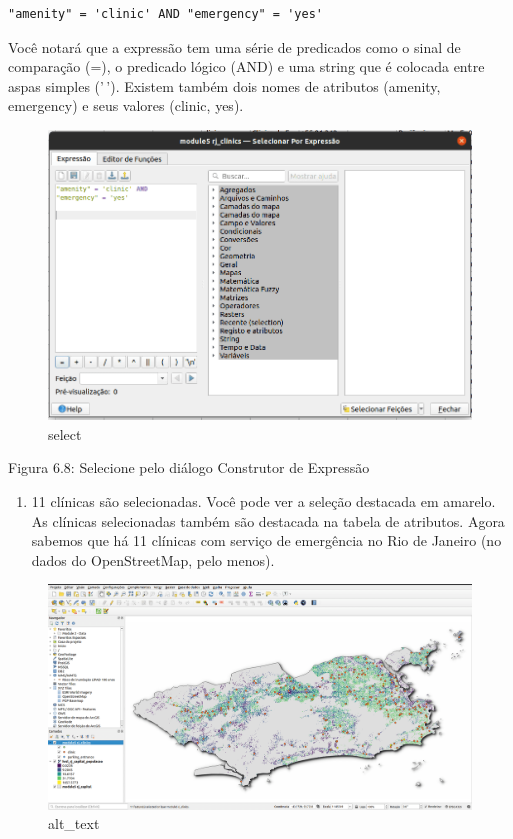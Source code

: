\documentclass[
]{krantz}
\providecommand{\tightlist}{%
  \setlength{\itemsep}{0pt}\setlength{\parskip}{0pt}}
\begin{document}
\begin{verbatim}
"amenity" = 'clinic' AND "emergency" = 'yes'
\end{verbatim}

Você notará que a expressão tem uma série de predicados como o sinal de comparação (=), o predicado lógico (AND) e uma string que é colocada entre aspas simples ('\,'). Existem também dois nomes de atributos (amenity, emergency) e seus valores (clinic, yes).

\begin{figure}
\centering
\includegraphics{media/modulo6/select.png}
\caption{select}
\end{figure}

Figura 6.8: Selecione pelo diálogo Construtor de Expressão

\begin{enumerate}
\def\labelenumi{\arabic{enumi}.}
\setcounter{enumi}{2}
\tightlist
\item
  11 clínicas são selecionadas. Você pode ver a seleção destacada em amarelo. As clínicas selecionadas também são destacada na tabela de atributos. Agora sabemos que há 11 clínicas com serviço de emergência no Rio de Janeiro (no dados do OpenStreetMap, pelo menos).
\end{enumerate}

\begin{figure}
\centering
\includegraphics{media/modulo6/selected-canvas.png}
\caption{alt\_text}
\end{figure}
\end{document}
